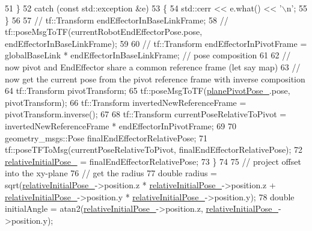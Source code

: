 \begin{DoxyCode}
51             \}
52             \textcolor{keywordflow}{catch} (\textcolor{keyword}{const} std::exception &e)
53             \{
54                 std::cerr << e.what() << \textcolor{charliteral}{'\(\backslash\)n'};
55             \}
56 
57             \textcolor{comment}{// tf::Transform endEffectorInBaseLinkFrame;}
58             \textcolor{comment}{// tf::poseMsgToTF(currentRobotEndEffectorPose.pose, endEffectorInBaseLinkFrame);}
59 
60             \textcolor{comment}{// tf::Transform endEffectorInPivotFrame = globalBaseLink * endEffectorInBaseLinkFrame; // pose
       composition}
61 
62             \textcolor{comment}{// now pivot and EndEffector share a common reference frame (let say map)}
63             \textcolor{comment}{// now get the current pose from the pivot reference frame with inverse composition}
64             tf::Transform pivotTransform;
65             tf::poseMsgToTF(\hyperlink{classcl__move__group__interface_1_1CbCircularPivotMotion_a0994efbe93b9f9a61fcf3703c360cda2}{planePivotPose\_}.pose, pivotTransform);
66             tf::Transform invertedNewReferenceFrame = pivotTransform.inverse();
67 
68             tf::Transform currentPoseRelativeToPivot = invertedNewReferenceFrame * endEffectorInPivotFrame;
69 
70             geometry\_msgs::Pose finalEndEffectorRelativePose;
71             tf::poseTFToMsg(currentPoseRelativeToPivot, finalEndEffectorRelativePose);
72             \hyperlink{classcl__move__group__interface_1_1CbCircularPivotMotion_a1b2cc65d2f27a4dec54c20f1f00d4bb8}{relativeInitialPose\_} = finalEndEffectorRelativePose;
73         \}
74 
75         \textcolor{comment}{// project offset into the xy-plane}
76         \textcolor{comment}{// get the radius}
77         \textcolor{keywordtype}{double} radius = sqrt(\hyperlink{classcl__move__group__interface_1_1CbCircularPivotMotion_a1b2cc65d2f27a4dec54c20f1f00d4bb8}{relativeInitialPose\_}->position.z * 
      \hyperlink{classcl__move__group__interface_1_1CbCircularPivotMotion_a1b2cc65d2f27a4dec54c20f1f00d4bb8}{relativeInitialPose\_}->position.z + \hyperlink{classcl__move__group__interface_1_1CbCircularPivotMotion_a1b2cc65d2f27a4dec54c20f1f00d4bb8}{relativeInitialPose\_}->position.y
       * \hyperlink{classcl__move__group__interface_1_1CbCircularPivotMotion_a1b2cc65d2f27a4dec54c20f1f00d4bb8}{relativeInitialPose\_}->position.y);
78         \textcolor{keywordtype}{double} initialAngle = atan2(\hyperlink{classcl__move__group__interface_1_1CbCircularPivotMotion_a1b2cc65d2f27a4dec54c20f1f00d4bb8}{relativeInitialPose\_}->position.z, 
      \hyperlink{classcl__move__group__interface_1_1CbCircularPivotMotion_a1b2cc65d2f27a4dec54c20f1f00d4bb8}{relativeInitialPose\_}->position.y);

\end{DoxyCode}
